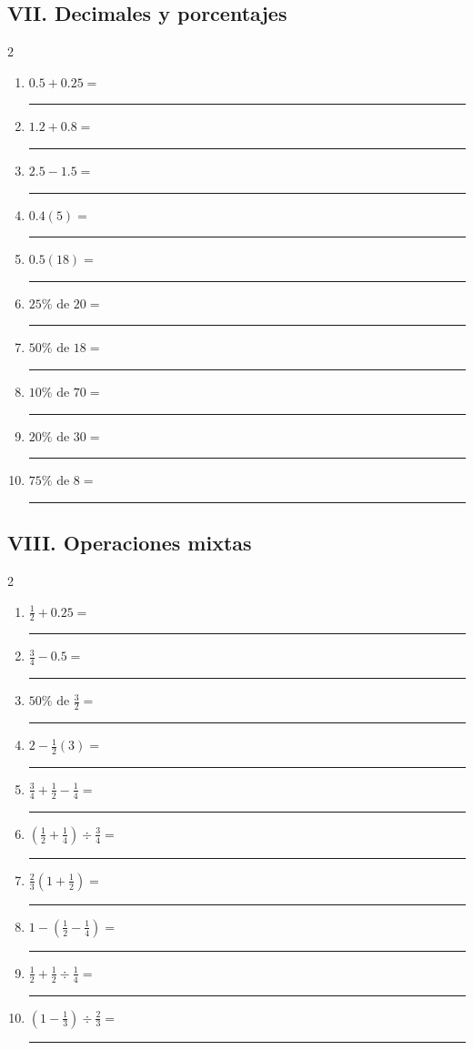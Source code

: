 \documentclass[11pt]{article}
\begin{document}
\subsection*{VII. Decimales y porcentajes}
\begin{multicols}{2}\begin{enumerate}[leftmargin=*,start=81]
\item $\displaystyle 0.5+0.25=$ \rule{2.2cm}{0.4pt}
\item $\displaystyle 1.2+0.8=$ \rule{2.2cm}{0.4pt}
\item $\displaystyle 2.5-1.5=$ \rule{2.2cm}{0.4pt}
\item $\displaystyle 0.4(5)=$ \rule{2.2cm}{0.4pt}
\item $\displaystyle 0.5(18)=$ \rule{2.2cm}{0.4pt}
\item $\displaystyle 25\%\text{ de }20=$ \rule{2.2cm}{0.4pt}
\item $\displaystyle 50\%\text{ de }18=$ \rule{2.2cm}{0.4pt}
\item $\displaystyle 10\%\text{ de }70=$ \rule{2.2cm}{0.4pt}
\item $\displaystyle 20\%\text{ de }30=$ \rule{2.2cm}{0.4pt}
\item $\displaystyle 75\%\text{ de }8=$ \rule{2.2cm}{0.4pt}
\end{enumerate}\end{multicols}
\subsection*{VIII. Operaciones mixtas}
\begin{multicols}{2}\begin{enumerate}[leftmargin=*,start=91]
\item $\displaystyle \frac12+0.25=$ \rule{2.2cm}{0.4pt}
\item $\displaystyle \frac34-0.5=$ \rule{2.2cm}{0.4pt}
\item $\displaystyle 50\%\text{ de }\frac32=$ \rule{2.2cm}{0.4pt}
\item $\displaystyle 2-\frac12(3)=$ \rule{2.2cm}{0.4pt}
\item $\displaystyle \frac34+\frac12-\frac14=$ \rule{2.2cm}{0.4pt}
\item $\displaystyle \left(\frac12+\frac14\right)\div\frac34=$ \rule{2.2cm}{0.4pt}
\item $\displaystyle \frac23\left(1+\frac12\right)=$ \rule{2.2cm}{0.4pt}
\item $\displaystyle 1-\left(\frac12-\frac14\right)=$ \rule{2.2cm}{0.4pt}
\item $\displaystyle \frac12+\frac12\div\frac14=$ \rule{2.2cm}{0.4pt}
\item $\displaystyle \left(1-\frac13\right)\div\frac23=$ \rule{2.2cm}{0.4pt}
\end{enumerate}\end{multicols}
\end{document}
